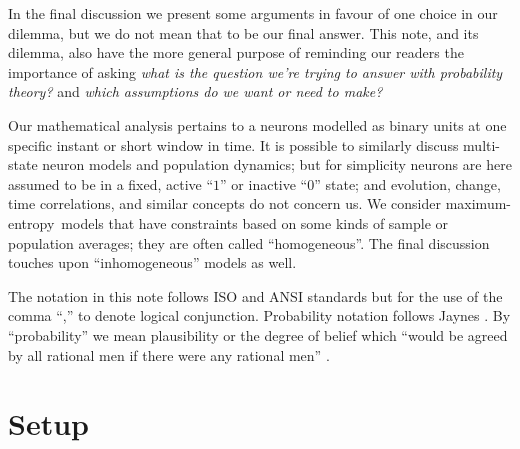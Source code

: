 \documentclass{article}
\theoremstyle{remark}
\theoremstyle{innote}
\newcommand*{\citep}{\parencites}
\renewcommand*{\cite}{\citep}
\renewcommand*{\|}{\mathpunct{|}}%
\theoremstyle{simple}
\newcommand*{\me}{maximum-entropy}
\begin{document}
In the final discussion we present some arguments in favour of one choice
in our dilemma, but we do not mean that to be our final answer. This note,
and its dilemma,  also have the more general purpose of reminding our
readers the importance of asking \emph{what is the question we're trying to
  answer with probability theory?} and \emph{which assumptions do we want
  or need to make?}

Our mathematical analysis pertains to a neurons modelled as binary units at
one specific instant or short window in time. It is possible to similarly
discuss multi-state neuron models and population dynamics; but for
simplicity neurons are here assumed to be in a fixed, active \enquote{$1$}
or inactive \enquote{$0$} state; and evolution, change, time correlations,
and similar concepts do not concern us. We consider \me\ models that have
constraints based on some kinds of sample or population averages; they are
often called \enquote{homogeneous}. The final discussion touches upon
\enquote{inhomogeneous} models as well.


The notation in this note follows ISO and ANSI standards
\citep{iso1993,ieee1993,nist1995} but for the use of the comma \enquote{,}
to denote logical conjunction. Probability notation follows Jaynes
\citep{jaynes1994_r2003}. By \enquote{probability} we mean plausibility or
the degree of belief which \enquote{would be agreed by all rational men if
  there were any rational men} \cite{good1966}.

\section{Setup}
\label{sec:setup}
\end{document}
